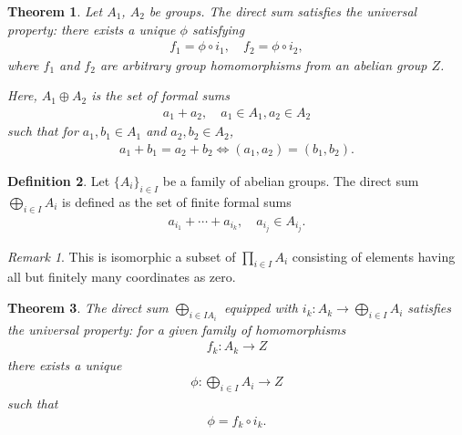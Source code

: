 \documentclass[12pt]{report}
\theoremstyle{plain}
\newtheorem{theorem}{Theorem}[section]
\theoremstyle{remark}
\newtheorem*{remark}{Remark}
\theoremstyle{definition}
\newtheorem{definition}[theorem]{Definition}
\begin{document}
\begin{theorem}
    Let $A_1$, $A_2$ be groups. The direct sum satisfies the universal property: there exists a unique $\phi$ satisfying
    \begin{align*}
        f_1=\phi\circ i_1,\quad f_2=\phi\circ i_2,
    \end{align*}
    where $f_1$ and $f_2$ are arbitrary group homomorphisms from an abelian group $Z$.
    \begin{figure}[H]
    \centering
    \end{figure}
    \noindent
    Here, $A_1\oplus A_2$ is the set of formal sums
    \begin{align*}
        a_1+a_2,\quad a_1\in A_1,a_2\in A_2
    \end{align*}
    such that for $a_1,b_1\in A_1$ and $a_2,b_2\in A_2$,
    \begin{align*}
        a_1+b_1=a_2+b_2 \Leftrightarrow (a_1,a_2)=(b_1,b_2).
    \end{align*}
\end{theorem}

\begin{definition}
    Let $\{A_i\}_{i\in I}$ be a family of abelian groups. The direct sum $\bigoplus_{i\in I} A_i$ is defined as the set of finite formal sums
    \begin{align*}
        a_{i_1}+\cdots+a_{i_k},\quad a_{i_j}\in A_{i_j}.
    \end{align*}
\end{definition}
\begin{remark}
    This is isomorphic a subset of $\prod_{i\in I} A_i$ consisting of elements having all but finitely many coordinates as zero.
\end{remark}

\begin{theorem}
    The direct sum $\bigoplus_{i\in I A_i}$ equipped with $i_k:A_k\rightarrow \bigoplus _{i\in I} A_i$ satisfies the universal property: for a given family of homomorphisms
    \begin{align*}
        f_k:A_k\rightarrow Z
    \end{align*}
    there exists a unique
    \begin{align*}
        \phi:\bigoplus_{i\in I}A_i\rightarrow Z
    \end{align*}
    such that
    \begin{align*}
        \phi=f_k\circ i_k.
    \end{align*}
\end{theorem}
\end{document}
